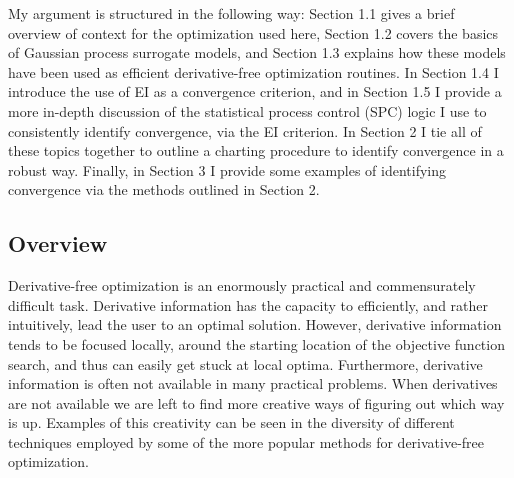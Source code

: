 \documentclass[12pt]{article}
\def \EIx {
	\mathbb{E}\left[~\text{I}(\underline{\bm{x}})~\right]
}
\begin{document}
	
	My argument is structured in the following way: Section 1.1 gives a brief overview of context for the optimization used here, Section 1.2 covers the basics of Gaussian process surrogate models, and Section 1.3 explains how these models have been used as efficient derivative-free optimization routines.
	In Section 1.4 I introduce the use of EI as a convergence criterion, and in Section 1.5 I provide a more in-depth discussion of the statistical process control (SPC) logic I use to consistently identify convergence, via the EI criterion.
	In Section 2 I tie all of these topics together to outline a charting procedure to identify convergence in a robust way.
	Finally, in Section 3 I provide some examples of identifying convergence via the methods outlined in Section 2. 
	
	\subsection{Overview}
	
	Derivative-free optimization is an enormously practical and commensurately difficult task.
	Derivative information has the capacity to efficiently, and rather intuitively, lead the user to an optimal solution. %
	However, derivative information tends to be focused locally, around the starting location of the objective function search, and thus can easily get stuck at local optima.
	Furthermore, derivative information is often not available in many practical problems.
	When derivatives are not available we are left to find more creative ways of figuring out which way is up.
	Examples of this creativity can be seen in the diversity of different techniques employed by some of the more popular methods for derivative-free optimization.
	
\end{document}
